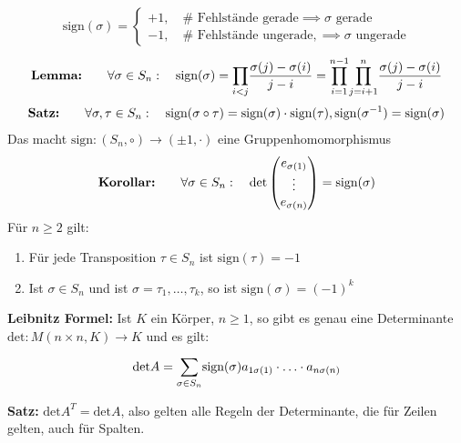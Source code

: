 \begin{align*}
    \text{sign}(\sigma) = \begin{cases}
        +1, \quad \# \text{ Fehlstände gerade} \implies \sigma \text{ gerade}\\
        -1, \quad \# \text{ Fehlstände ungerade}, \implies \sigma \text{ ungerade}
    \end{cases}
\end{align*}
\begin{align*}
    \text{\textbf{Lemma:}} \qquad \forall \sigma \in S_n: \quad \text{sign}(\sigma) = \underset{i < j}{\overset{}{\prod}} \frac{\sigma(j) - \sigma(i)}{j-i} = \underset{i = 1}{\overset{n-1}{\prod}} \underset{j = i+1}{\overset{n}{\prod}} \frac{\sigma(j) - \sigma(i)}{j-i}
\end{align*}
\begin{align*}
    \text{\textbf{Satz:}} \qquad \forall \sigma, \tau \in S_n: \quad \text{sign}(\sigma \circ \tau) = \text{sign}(\sigma) \cdot \text{sign}(\tau), \text{sign}({\sigma}^{-1}) = \text{sign}(\sigma)
\end{align*}
Das macht $\text{sign}: (S_n, \circ) \rightarrow ({\pm 1}, \cdot)$ eine Gruppenhomomorphismus
\begin{align*}
    \text{\textbf{Korollar:}} \qquad \forall \sigma \in S_n: \quad \text{det}\begin{pmatrix}
    e_{\sigma(1)} \\ \vdots \\	 e_{\sigma(n)}
    \end{pmatrix} = \text{sign}(\sigma)
\end{align*}
Für $n \geq 2$ gilt:
\begin{enumerate}[{(}1{.)}]
    \item	Für jede Transposition $\tau \in S_n$ ist $\text{sign}(\tau) = -1$
    
    \item Ist $\sigma \in S_n$ und ist $\sigma = \tau_1, \ldots, \tau_k$, so ist $\text{sign}(\sigma) = (-1)^k$
\end{enumerate}
\begin{mdframed}
\textbf{Leibnitz Formel:} \quad Ist $K$ ein Körper, $n \geq 1$, so gibt es genau eine Determinante $\text{det}: M(n\times n,K) \rightarrow K$ und es gilt:
\begin{align*}
    \text{det} A = \underset{\sigma \in S_n}{\overset{}{\sum}} \text{sign}(\sigma) a_{1\sigma(1)} \cdot \ldots \cdot a_{n\sigma(n)}
\end{align*}
\end{mdframed}
\textbf{Satz:} \quad $\text{det}A^T = \text{det}A$, also gelten alle Regeln der Determinante, die für Zeilen gelten, auch für Spalten.\\
